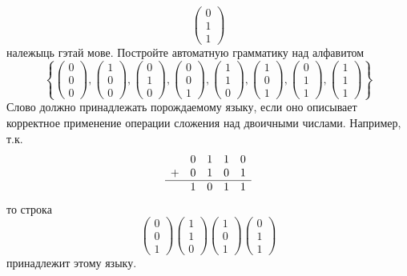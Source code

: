 \documentclass[12pt, a4paper]{article}
\begin{document}
\begin{problemList}
{\[\begin{pmatrix} 0 \\ 1 \\ 1 \end{pmatrix}
\]
належыць гэтай мове.
}
{%
Постройте автоматную грамматику над алфавитом
\[
\left\{
\begin{pmatrix} 0 \\ 0\\ 0 \end{pmatrix},
\begin{pmatrix} 1 \\ 0 \\ 0 \end{pmatrix},
\begin{pmatrix} 0 \\ 1 \\ 0 \end{pmatrix},
\begin{pmatrix} 0 \\ 0 \\ 1 \end{pmatrix},
\begin{pmatrix} 1 \\ 1 \\ 0 \end{pmatrix},
\begin{pmatrix} 1 \\ 0 \\ 1 \end{pmatrix},
\begin{pmatrix} 0 \\ 1 \\ 1 \end{pmatrix},
\begin{pmatrix} 1 \\ 1 \\ 1 \end{pmatrix}
\right\}
\]
Слово должно принадлежать порождаемому языку,
если оно описывает корректное применение операции сложения над двоичными числами. Например, т.к.
\[
\begin{matrix}
& 0 & 1 & 1 & 0 \\
+ & 0& 1& 0& 1 \\
\hline
& 1& 0& 1& 1
\end{matrix}
\]
то строка 
\[
\begin{pmatrix} 0 \\ 0 \\ 1 \end{pmatrix}
\begin{pmatrix} 1 \\ 1 \\ 0 \end{pmatrix}
\begin{pmatrix} 1 \\ 0 \\ 1 \end{pmatrix}
\begin{pmatrix} 0 \\ 1 \\ 1 \end{pmatrix}
\]
принадлежит этому языку.
}

\end{problemList}
\end{document}
